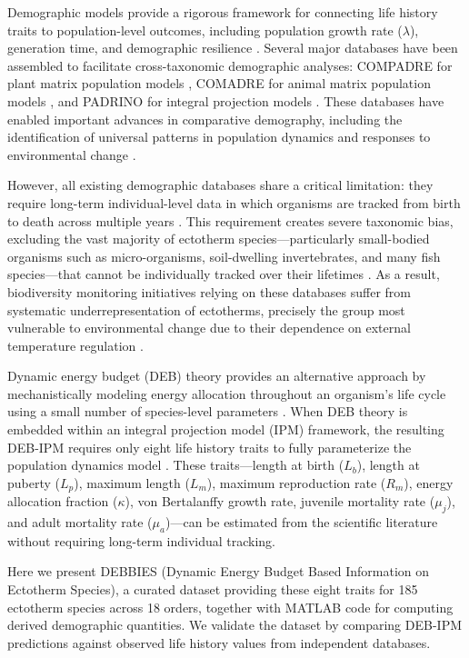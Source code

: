 \documentclass[11pt]{article}
\begin{document}
Demographic models provide a rigorous framework for connecting life history traits to population-level outcomes, including population growth rate ($\lambda$), generation time, and demographic resilience \citep{Caswell2001}. Several major databases have been assembled to facilitate cross-taxonomic demographic analyses: COMPADRE for plant matrix population models \citep{Salguero-Gomez2015}, COMADRE for animal matrix population models \citep{Salguero-Gomez2016b}, and PADRINO for integral projection models \citep{Levin2022}. These databases have enabled important advances in comparative demography, including the identification of universal patterns in population dynamics and responses to environmental change \citep{Salguero-Gomez2017}.

However, all existing demographic databases share a critical limitation: they require long-term individual-level data in which organisms are tracked from birth to death across multiple years \citep{Clutton-Brock2002}. This requirement creates severe taxonomic bias, excluding the vast majority of ectotherm species---particularly small-bodied organisms such as micro-organisms, soil-dwelling invertebrates, and many fish species---that cannot be individually tracked over their lifetimes \citep{Conde2019}. As a result, biodiversity monitoring initiatives relying on these databases suffer from systematic underrepresentation of ectotherms, precisely the group most vulnerable to environmental change due to their dependence on external temperature regulation \citep{Deutsch2008}.

Dynamic energy budget (DEB) theory provides an alternative approach by mechanistically modeling energy allocation throughout an organism's life cycle using a small number of species-level parameters \citep{Kooijman2010,Nisbet2000}. When DEB theory is embedded within an integral projection model (IPM) framework, the resulting DEB-IPM requires only eight life history traits to fully parameterize the population dynamics model \citep{Smallegange2017,Smallegange2021}. These traits---length at birth ($L_b$), length at puberty ($L_p$), maximum length ($L_m$), maximum reproduction rate ($R_m$), energy allocation fraction ($\kappa$), von Bertalanffy growth rate, juvenile mortality rate ($\mu_j$), and adult mortality rate ($\mu_a$)---can be estimated from the scientific literature without requiring long-term individual tracking.

Here we present DEBBIES (Dynamic Energy Budget Based Information on Ectotherm Species), a curated dataset providing these eight traits for 185 ectotherm species across 18 orders, together with MATLAB code for computing derived demographic quantities. We validate the dataset by comparing DEB-IPM predictions against observed life history values from independent databases.
\end{document}
